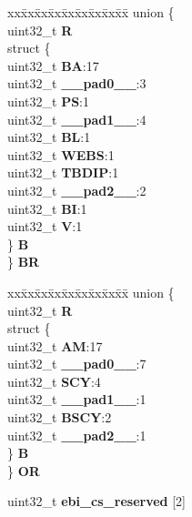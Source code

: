 \begin{DoxyCompactItemize}
\begin{tabbing}
\end{tabbing}\item 
\mbox{\label{structEBI__CS__tag_a318b96b6d9c6a1da103b802e1dbcb324}} 
\begin{tabbing}
xx\=xx\=xx\=xx\=xx\=xx\=xx\=xx\=xx\=\kill
union \{\\
\>uint32\_t {\bfseries R}\\
\>struct \{\\
\>\>uint32\_t {\bfseries BA}:17\\
\>\>uint32\_t {\bfseries \_\_pad0\_\_}:3\\
\>\>uint32\_t {\bfseries PS}:1\\
\>\>uint32\_t {\bfseries \_\_pad1\_\_}:4\\
\>\>uint32\_t {\bfseries BL}:1\\
\>\>uint32\_t {\bfseries WEBS}:1\\
\>\>uint32\_t {\bfseries TBDIP}:1\\
\>\>uint32\_t {\bfseries \_\_pad2\_\_}:2\\
\>\>uint32\_t {\bfseries BI}:1\\
\>\>uint32\_t {\bfseries V}:1\\
\>\} {\bfseries B}\\
\} {\bfseries BR}\\

\end{tabbing}\item 
\mbox{\label{structEBI__CS__tag_a0c0d2619b0765f077d2d439bd311cc9c}} 
\begin{tabbing}
xx\=xx\=xx\=xx\=xx\=xx\=xx\=xx\=xx\=\kill
union \{\\
\>uint32\_t {\bfseries R}\\
\>struct \{\\
\>\>uint32\_t {\bfseries AM}:17\\
\>\>uint32\_t {\bfseries \_\_pad0\_\_}:7\\
\>\>uint32\_t {\bfseries SCY}:4\\
\>\>uint32\_t {\bfseries \_\_pad1\_\_}:1\\
\>\>uint32\_t {\bfseries BSCY}:2\\
\>\>uint32\_t {\bfseries \_\_pad2\_\_}:1\\
\>\} {\bfseries B}\\
\} {\bfseries OR}\\

\end{tabbing}\item 
\mbox{\label{structEBI__CS__tag_ac676c494bc9529058291153824eb313b}} 
uint32\+\_\+t {\bfseries ebi\+\_\+cs\+\_\+reserved} \mbox{[}2\mbox{]}
\end{DoxyCompactItemize}


